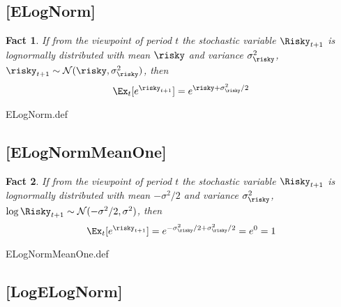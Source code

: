 \documentclass{handout}
\newtheorem{Fact}{Fact}
\begin{document}
\hypertarget{ELogNorm}{}
\subsection{{[{ELogNorm}]}}

\begin{Fact} If from the viewpoint of period $t$ the stochastic variable $\Risky_{t+1}$ is lognormally distributed with mean $\null{\risky}$ and variance $\sigma_{\risky}^{2}$, $\risky_{t+1} \sim \mathcal{N}(\null{\risky},\sigma_{\risky}^{2})$, then 
\begin{equation}
        \Ex_{t}[e^{\risky_{t+1}}] = e^{\null{\risky}+\sigma_{\risky}^{2}/2} \label{eq:ELogNorm}
\end{equation}
\end{Fact}

\begin{verbatimwrite}{ELogNorm.def}
\providecommand{\ELogNorm}{\href{https://www.econ2.jhu.edu/people/ccarroll/public/LectureNotes/MathFacts/MathFactsList\#ELogNorm}{\ensuremath{\mathtt{[ELogNorm]}}}}
\end{verbatimwrite}

\hypertarget{ELogNormMeanOne}{}
\subsection{[ELogNormMeanOne]}

\begin{Fact} If from the viewpoint of period $t$ the stochastic variable $\Risky_{t+1}$ is lognormally distributed with mean $-\sigma^{2}/2$ and variance $\sigma_{\risky}^{2}$, $\log \Risky_{t+1} \sim \mathcal{N}(-\sigma^{2}/2,\sigma^{2})$, then 
\begin{equation}
        \Ex_{t}[e^{\risky_{t+1}}] = e^{-\sigma_{\risky}^{2}/2+\sigma_{\risky}^{2}/2}=e^{0}=1 \label{eq:ELogNormMeanOne}
\end{equation}
\end{Fact}

\begin{verbatimwrite}{ELogNormMeanOne.def}
\providecommand{\ELogNormMeanOne}{\href{https://www.econ2.jhu.edu/people/ccarroll/public/LectureNotes/MathFacts/MathFactsList\#ELogNormMeanOne}{\ensuremath{\mathtt{[ELogNormMeanOne]}}}}
\end{verbatimwrite}

\hypertarget{LogELogNorm}{}
\subsection{[LogELogNorm]}
\end{document}
